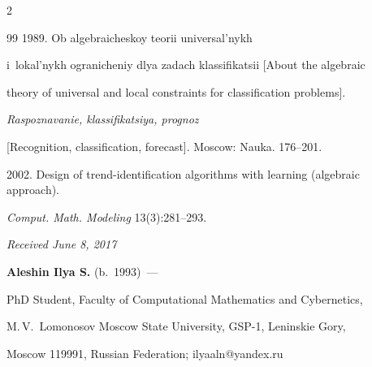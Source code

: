 \begin{multicols}{2}
{{\begin{thebibliography}{99}
 1989. Ob algebraicheskoy teorii universal'nykh 


i~lokal'nykh ogranicheniy dlya zadach klassifikatsii [About the algebraic 


theory of universal and local constraints for classification problems].


\textit{Raspoznavanie, klassifikatsiya, prognoz} 


[Recognition, classification, forecast]. Moscow: Nauka. 176--201.






2002. Design of trend-identification algorithms with learning (algebraic approach).


 \textit{Comput. Math. Modeling} 13(3):281--293.





\end{thebibliography}





 }


 }





\end{multicols}





\vspace*{-6pt}





\hfill{\small\textit{Received June 8, 2017}}










\Contrl





\noindent


\textbf{Aleshin Ilya  S.} (b.\ 1993)~--- 


PhD Student, Faculty of Computational Mathematics and Cybernetics, 


M.\,V.~Lomonosov Moscow State University, GSP-1, Leninskie Gory, 


Moscow 119991, Russian Federation; \mbox{ilyaaln@yandex.ru}





\label{end\stat}








\renewcommand{\bibname}{\protect\rm Литература} 


